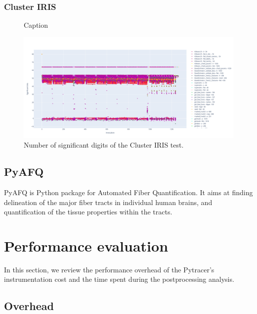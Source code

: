 \documentclass[11pt]{article}
\begin{document}


\subsubsection{Cluster IRIS}


\begin{figure}
    \centering
    \caption{Caption}
    \includegraphics[width=\linewidth]{figure/cluster_iris/general.png}
    \caption{Number of significant digits of the Cluster IRIS test.}
    \label{fig:cluster_iris_general}
\end{figure}

\subsection{PyAFQ}


PyAFQ is Python package for Automated Fiber Quantification.
It aims at finding delineation of the major fiber tracts in individual human brains, and quantification of the tissue properties within the tracts.

\section{Performance evaluation}

In this section, we review the performance overhead of the Pytracer's instrumentation cost
and the time spent during the postprocessing analysis. 

\subsection{Overhead}
\end{document}
